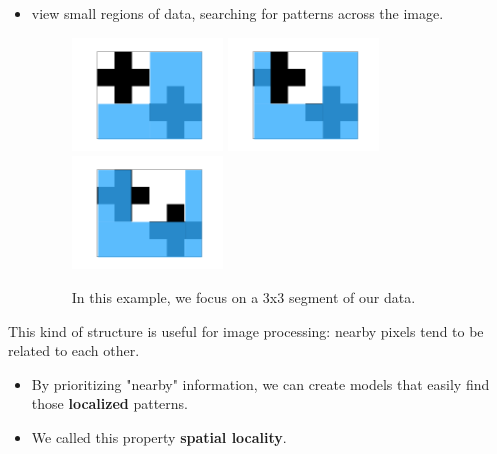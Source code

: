     \begin{itemize}
        \item {} view small regions of data, searching for patterns across the image.

        \begin{figure}[H]
            \includegraphics[width=40mm,scale=0.5]{images/convolutional_neural_networks_images/window.png}
            \includegraphics[width=40mm,scale=0.5]{images/convolutional_neural_networks_images/window2.png}
            \includegraphics[width=40mm,scale=0.5]{images/convolutional_neural_networks_images/window3.png}
            
            \caption*{In this example, we focus on a 3x3 segment of our data.}
        \end{figure}

        
    \end{itemize}

    This kind of structure is useful for image processing: nearby pixels tend to be related to each other.

    \begin{itemize}
        \item By prioritizing "nearby" information, we can create models that easily find those \textbf{localized} patterns.
        
        \item We called this property \textbf{spatial locality}.\\
    \end{itemize}

